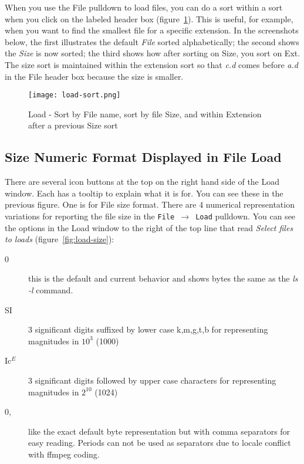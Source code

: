 When you use the File pulldown to load files, you can do a sort within a sort when you click on the labeled header box (figure~\ref{fig:load-sort}).  This is useful, for example, when you want to find the smallest file for a specific extension.   In the screenshots below, the first illustrates the default \textit{File} sorted alphabetically; the second shows the \textit{Size} is now sorted; the third shows how after sorting on Size, you sort on Ext.  The size sort is maintained within the extension sort so that \textit{c.d} comes before \textit{a.d} in the File header box because the size is smaller.

\begin{figure}[htpb]
    \centering
    \texttt{[image: load-sort.png]}
    \caption{Load - Sort by File name, sort by file Size, and within Extension after a previous Size sort}
    \label{fig:load-sort}
\end{figure}

\subsection{Size Numeric Format Displayed in File Load}%
\label{sub:size_numeric_format_displayed_file_load}

There are several icon buttons at the top on the right hand side of the Load window.  Each has a tooltip to explain what it is for.  You can see these in the previous figure.  One is for File size format.  There are 4 numerical representation variations for reporting the file size in the \texttt{File $\rightarrow$ Load} pulldown.    You can see the options in the Load window to the right of the top line that read \textit{Select files to loads} (figure~\ref{fig:load-size}):

\begin{description}
    \item[0] this is the default and current behavior and shows bytes the same as the \textit{ls -l} command.
    \item[SI] 3 significant digits suffixed by lower case k,m,g,t,b for representing magnitudes in $10^3$ (1000)
    \item[Ic$^{E}$] 3 significant digits followed by upper case characters for representing magnitudes in $2^{10}$ (1024)
    \item[0,] like the exact default byte representation but with comma separators for easy reading.  Periods can
    not be used as separators due to locale conflict with ffmpeg coding.
\end{description}

